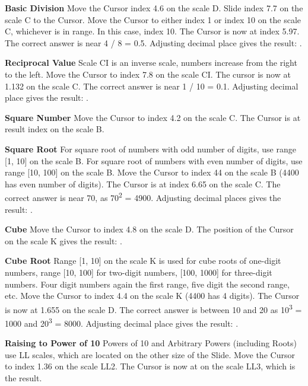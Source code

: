 \begin{multicols*}{3}
{  \textbf{Basic Division} 
Move the Cursor index 4.6 on the scale D.
Slide index 7.7 on the scale C to the Cursor.
Move the Cursor to either index 1 or index 10 on the scale C, whichever is in range. In this case, index 10.
The Cursor is now at index 5.97. The correct answer is near 4 / 8 = 0.5. Adjusting decimal place gives the result: .

  \textbf{Reciprocal Value} 
\footnotesize Scale CI is an inverse scale, numbers increase from the right to the left. \normalsize
Move the Cursor to index 7.8 on the scale CI.
The cursor is now at 1.132 on the scale C.
The correct answer is near 1 / 10 = 0.1. Adjusting decimal place gives the result: .

  \textbf{Square Number} 
Move the Cursor to index 4.2 on the scale C.
The Cursor is at result index  on the scale B.

  \textbf{Square Root}
\footnotesize For square root of numbers with odd number of digits, use range [1, 10] on the scale B. For square root of numbers with even number of digits, use range [10, 100] on the scale B. \normalsize
{}
Move the Cursor to index 44 on the scale B (4400 has even number of digits).
The Cursor is at index 6.65 on the scale C. The correct answer is near 70, as 70\textsuperscript{2} = 4900. Adjusting decimal places gives the result: .

  \textbf{Cube} 
Move the Cursor to index 4.8 on the scale D.
The position of the Cursor on the scale K gives the result: .

  \textbf{Cube Root}
\footnotesize Range [1, 10] on the scale K is used for cube roots of one-digit numbers, range [10, 100] for two-digit numbers, [100, 1000] for three-digit numbers. Four digit numbers again the first range, five digit the second range, etc. \normalsize
{}
Move the Cursor to index 4.4 on the scale K (4400 has 4 digits).
The Cursor is now at 1.655 on the scale D.
The correct answer is between 10 and 20 as 10\textsuperscript{3} = 1000 and 20\textsuperscript{3} = 8000. Adjusting decimal place gives the result: .

  \textbf{Raising to Power of 10} 
\footnotesize Powers of 10 and Arbitrary Powers (including Roots) use LL scales, which are located on the other size of the Slide. \normalsize
Move the Cursor to index 1.36 on the scale LL2.
The Cursor is now at  on the scale LL3, which is the result.

}
\end{multicols*}
